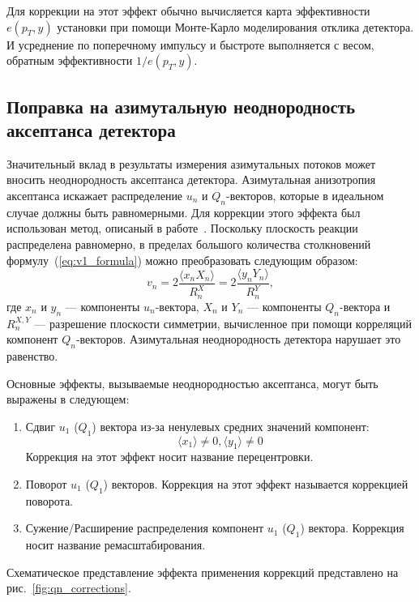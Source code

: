 Для коррекции на этот эффект обычно вычисляется карта эффективности $e(p_T, y)$ установки при помощи Монте-Карло моделирования отклика детектора.
И усреднение по поперечному импульсу и быстроте выполняется с весом, обратным эффективности $1/e(p_T, y)$.

\subsection{Поправка на азимутальную неоднородность аксептанса детектора}

Значительный вклад в результаты измерения азимутальных потоков может вносить неоднородность аксептанса детектора. 
Азимутальная анизотропия аксептанса искажает распределение $u_n$  и $Q_n$-векторов, которые в идеальном случае должны быть равномерными. 
Для коррекции этого эффекта был использован метод, описаный в работе~\cite{Selyuzhenkov:2007zi}.
Поскольку плоскость реакции распределена равномерно, в пределах большого количества столкновений формулу~(\ref{eq:v1_formula}) можно преобразовать следующим образом:
%
\begin{equation}
    v_n =  2\frac{ \langle x_n X_n \rangle }{R_n^X} = 2\frac{ \langle y_n Y_n \rangle }{R_n^Y},
\end{equation}
%
где $x_n$ и $y_n$ --- компоненты $u_n$-вектора, $X_n$ и $Y_n$ --- компоненты $Q_n$-вектора и $R_n^{X,Y}$ --- разрешение плоскости симметрии, вычисленное при помощи корреляций компонент $Q_n$-векторов.
Азимутальная неоднородность детектора нарушает это равенство.

Основные эффекты, вызываемые неоднородностью аксептанса, могут быть выражены в следующем:
\begin{enumerate}
    \item Сдвиг $u_1$ ($Q_1$) вектора из-за ненулевых средних значений компонент:
    \begin{equation}
        \langle x_1 \rangle \ne 0, \langle y_1 \rangle \ne 0
    \end{equation}
    Коррекция на этот эффект носит название перецентровки.
    \item Поворот $u_1$ ($Q_1$) векторов. Коррекция на этот эффект называется коррекцией поворота.
    \item Сужение/Расширение распределения компонент $u_1$ ($Q_1$) вектора. Коррекция носит название ремасштабирования.
\end{enumerate}
Схематическое представление эффекта применения коррекций представлено на рис.~\ref{fig:qn_corrections}.

